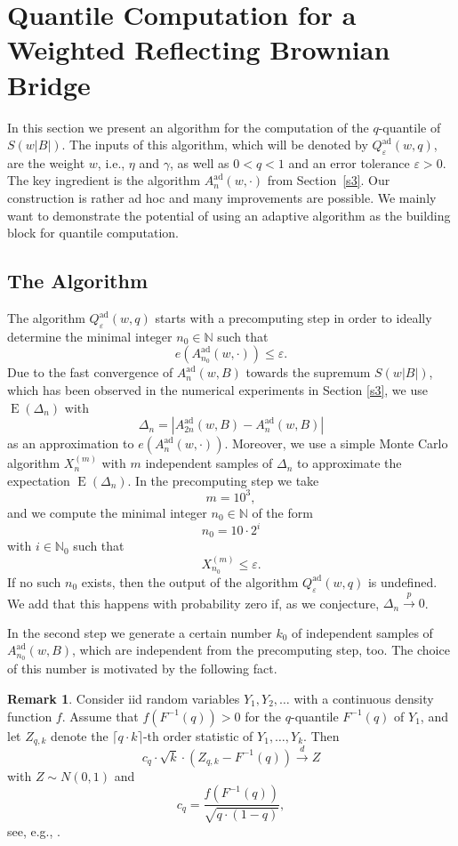 \documentclass[a4paper]{amsart}
\theoremstyle{definition}
\newtheorem{rem}[exmp]{Remark}
\theoremstyle{plain}
\newcommand{\N}{\mathbb N}
\newcommand{\e}{\varepsilon}
\newcommand{\E}{\operatorname{E}}
\newcommand{\dconv}{ \ensuremath{ \overset{d}{\longrightarrow}}}
\newcommand{\pconv}{\ensuremath{ \overset p {\longrightarrow}}}
\newcommand{\adap}{\ensuremath{ \mathrm{ad} }}
\begin{document}
\section{Quantile Computation for a Weighted Reflecting Brownian Bridge}
\label{s5}

In this section we present an algorithm
for the computation of the $q$-quantile of $S(w |B|)$.
The inputs of this algorithm, which will be denoted by
$Q^\adap_\e(w, q)$,
are the weight $w$, i.e., $\eta$ and $\gamma$, as well as
$0 < q < 1$ and an error tolerance $\e>0$.
The key ingredient is the algorithm $A^\adap_n(w,\cdot)$ from
Section~\ref{s3}. Our construction is rather ad hoc
and many improvements are possible. We mainly want to demonstrate the
potential of using an adaptive algorithm as the building block
for quantile computation.

\subsection{The Algorithm}\label{s5.1}

The algorithm $Q^\adap_\e(w, q)$ starts with a precomputing step in order
to ideally determine the minimal integer $n_0\in\N$ such that
\[
e(A^\adap_{n_0}(w,\cdot)) \leq \e.
\]
Due to the fast convergence of $A^\adap_{n}(w,B)$ towards the
supremum $S(w|B|)$, which has been observed in the numerical
experiments in Section \ref{s3}, we use $\E(\Delta_n)$ with
\[
\Delta_n=|A^\adap_{2n}(w,B)-A^\adap_n(w,B)|
\]
as an approximation to $e(A^\adap_n(w,\cdot))$.
Moreover, we use a simple Monte Carlo algorithm
$X_n^{(m)}$ with $m$ independent samples of
$\Delta_n$ to approximate the expectation $\E(\Delta_n)$.
In the precomputing step we take
\[
m = 10^3,
\]
and we compute the minimal integer $n_0 \in \N$ of the form
\[
n_0 = 10 \cdot 2^i
\]
with $i \in \N_0$ such that
\[
X^{(m)}_{n_0} \leq \e.
\]
If no such $n_0$ exists, then the output of the algorithm
$Q^\adap_\e(w, q)$ is undefined. We add that
this happens with probability zero if, as we conjecture,
$\Delta_n \pconv 0$.

In the second step we generate a certain number $k_0$ of
independent samples of $A^\adap_{n_0}(w,B)$, which are independent
from the precomputing step, too. The choice of this number is
motivated by the following fact.

\begin{rem}\label{r7}
Consider iid random variables $Y_1, Y_2, \dots$
with a continuous density function $f$. Assume
that $f(F^{-1}(q))>0$ for the $q$-quantile $F^{-1}(q)$ of $Y_1$, and let
$Z_{q,k}$ denote the $\lceil q\cdot k\rceil$-th
order statistic of $Y_1,\dots,Y_k$.
Then
\begin{equation*}
c_q \cdot \sqrt{k} \cdot (Z_{q,k}-F^{-1}(q)) \dconv Z
\end{equation*}
with $Z \sim N(0,1)$ and
\[
c_q = \frac{f(F^{-1}(q))}{\sqrt{q \cdot (1-q)}},
\]
see, e.g., \citet*[Thm.~10.3]{MR1994955}.
\end{rem}
\end{document}
